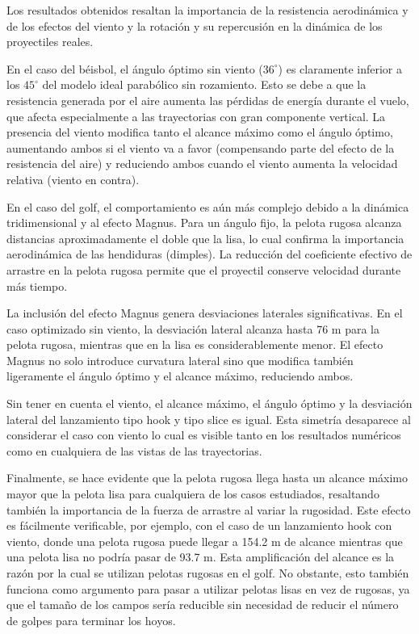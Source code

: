 \documentclass[11pt,a4paper]{article}
\begin{document}
Los resultados obtenidos resaltan la importancia de la resistencia aerodinámica y de los efectos del viento y la rotación y su repercusión en la dinámica de los proyectiles reales.

En el caso del béisbol, el ángulo óptimo sin viento ($36^\circ$) es claramente inferior a los $45^\circ$ del modelo ideal parabólico sin rozamiento. Esto se debe a que la resistencia generada por el aire aumenta las pérdidas de energía durante el vuelo, que afecta especialmente a las trayectorias con gran componente vertical. La presencia del viento modifica tanto el alcance máximo como el ángulo óptimo, aumentando ambos si el viento va a favor (compensando parte del efecto de la resistencia del aire) y reduciendo ambos cuando el viento aumenta la velocidad relativa (viento en contra).

En el caso del golf, el comportamiento es aún más complejo debido a la dinámica tridimensional y al efecto Magnus. Para un ángulo fijo, la pelota rugosa alcanza distancias aproximadamente el doble que la lisa, lo cual confirma la importancia aerodinámica de las hendiduras (dimples). La reducción del coeficiente efectivo de arrastre en la pelota rugosa permite que el proyectil conserve velocidad durante más tiempo.

La inclusión del efecto Magnus genera desviaciones laterales significativas. En el caso optimizado sin viento, la desviación lateral alcanza hasta 76 m para la pelota rugosa, mientras que en la lisa es considerablemente menor. El efecto Magnus no solo introduce curvatura lateral sino que modifica también ligeramente el ángulo óptimo y el alcance máximo, reduciendo ambos.

Sin tener en cuenta el viento, el alcance máximo, el ángulo óptimo y la desviación lateral del lanzamiento tipo hook y tipo slice es igual. Esta simetría desaparece al considerar el caso con viento lo cual es visible tanto en los resultados numéricos como en cualquiera de las vistas de las trayectorias.

Finalmente, se hace evidente que la pelota rugosa llega hasta un alcance máximo mayor que la pelota lisa para cualquiera de los casos estudiados, resaltando también la importancia de la fuerza de arrastre al variar la rugosidad. Este efecto es fácilmente verificable, por ejemplo, con el caso de un lanzamiento hook con viento, donde una pelota rugosa puede llegar a 154.2 m de alcance mientras que una pelota lisa no podría pasar de 93.7 m. Esta amplificación del alcance es la razón por la cual se utilizan pelotas rugosas en el golf. No obstante, esto también funciona como argumento para pasar a utilizar pelotas lisas en vez de rugosas, ya que el tamaño de los campos sería reducible sin necesidad de reducir el número de golpes para terminar los hoyos.
\end{document}

